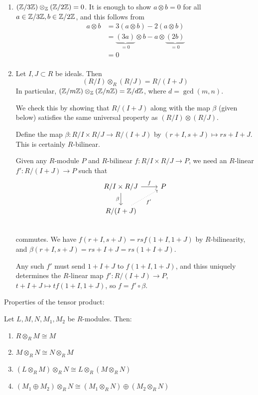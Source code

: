 \documentclass[x11names,reqno,14pt]{extarticle}
\begin{document}
\begin{enumerate}

\item $(\mathbb{Z}/3\mathbb{Z})\otimes_{\mathbb{Z}}(\mathbb{Z}/2\mathbb{Z}) = 0$. It is enough to show $a\otimes b = 0$ for all $a \in \mathbb{Z}/3\mathbb{Z}, b \in \mathbb{Z}/2\mathbb{Z}$, and this follows from 
\begin{align*}
a\otimes b & = 3(a\otimes b) - 2(a\otimes b) \\
			  & = \underbrace{(3a)}_{=0}\otimes b - a\otimes\underbrace{(2b)}_{=0} \\
			  & = 0 \\
\end{align*}

\item Let $I, J \subset R$ be ideals. Then 
\[
(R/I)\otimes_R(R/J) = R/(I + J)
\]
In particular, $(\mathbb{Z}/m\mathbb{Z})\otimes_{\mathbb{Z}}(\mathbb{Z}/n\mathbb{Z}) = \mathbb{Z}/d\mathbb{Z}$, where $d = \gcd(m, n)$. 

We check this by showing that $R/(I + J)$ along with the map $\beta$ (given below) satisfies the same universal property as $(R/I)\otimes(R/J)$.

Define the map $\beta:R/I\times R/J \to R/(I + J)$ by $(r + I, s + J) \mapsto rs + I + J$. This is certainly $R$-bilinear.

Given any $R$-module $P$ and $R$-bilinear $f:R/I\times R/J \to P$, we need an $R$-linear $f':R/(I + J)\to P$ such that 
\[
\begin{tikzcd}
R/I\times R/J \ar[r, "f"] \ar[d, "\beta"'] & P \\
R/(I + J) \ar[ur, dotted, "f'"'] \\
\end{tikzcd}
\]
commutes. We have $f(r + I, s + J) = rsf(1 + I, 1 + J)$ by $R$-bilinearity, and $\beta(r + I, s + J) = rs + I + J = rs(1 + I + J)$. 

Any such $f'$ must send $1 + I + J$ to $f(1 + I, 1 + J)$, and thiss uniquely determines the $R$-linear map $f':R/(I + J)\to P$, $t + I + J \mapsto tf(1 + I, 1 + J)$, so $f = f'\circ\beta$. 

\end{enumerate}

Properties of the tensor product:

\prop

Let $L, M, N, M_1, M_2$ be $R$-modules. Then:

\begin{enumerate}[label=(\alph*)]

\item $R\otimes_RM \cong M$  

\item $M\otimes_RN \cong N\otimes_RM$ 

\item $(L\otimes_RM)\otimes_RN \cong L\otimes_R(M\otimes_RN)$ 

\item $(M_1\oplus M_2)\otimes_RN \cong (M_1\otimes_RN)\oplus(M_2\otimes_RN)$

\end{enumerate}
\end{document}
